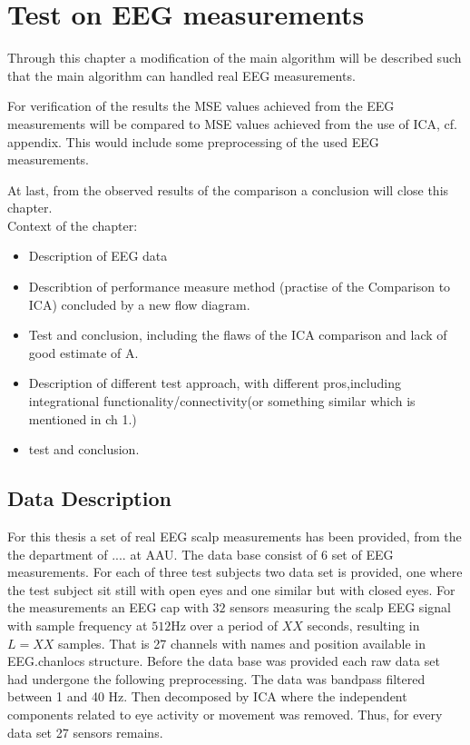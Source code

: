 \chapter{Test on EEG measurements}\label{ch:eeg_test}
Through this chapter a modification of the main algorithm will be described such that the main algorithm can handled real EEG measurements. 

For verification of the results the MSE values achieved from the EEG measurements will be compared to MSE values achieved from the use of ICA, cf. appendix. This would include some preprocessing of the used EEG measurements.

At last, from the observed results of the comparison a conclusion will close this chapter.\\
Context of the chapter:
\begin{itemize}
\item Description of EEG data
\item Describtion of performance measure method (practise of the Comparison to ICA) concluded by a new flow diagram.
\item Test and conclusion, including the flaws of the ICA comparison and lack of good estimate of A.
\item Description of different test approach, with different pros,including integrational functionality/connectivity(or something similar which is mentioned in ch 1.)
\item test and conclusion. 
\end{itemize}

\section{Data Description}
For this thesis a set of real EEG scalp measurements has been provided, from the the department of .... at AAU. 
The data base consist of 6 set of EEG measurements. For each of three test subjects two data set is provided, one where the test subject sit still with open eyes and one similar but with closed eyes.  
For the measurements an EEG cap with $32$ sensors measuring the scalp EEG signal with sample frequency at $512$Hz over a period of $XX$ seconds, resulting in $L = XX$ samples. That is 27 channels with names and position available in EEG.chanlocs structure.   
Before the data base was provided each raw data set had undergone the following preprocessing.
The data was bandpass filtered between 1 and 40 Hz. Then decomposed by ICA where the independent components related to eye activity or movement was removed. Thus, for every data set 27 sensors remains. 

